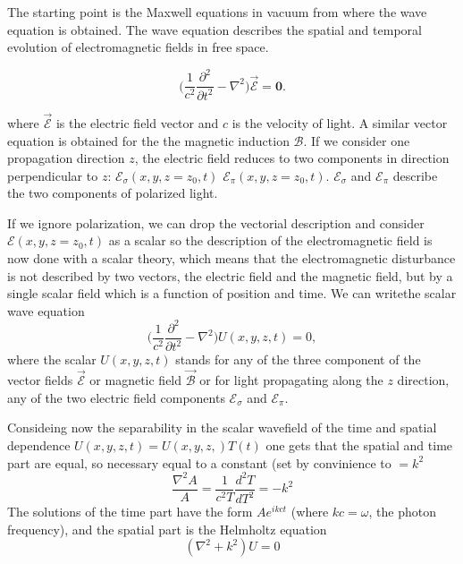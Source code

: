 \documentclass{iucr}              %
\begin{document}
The starting point is the Maxwell equations in vacuum from where the wave equation is obtained. The wave equation describes the spatial and temporal evolution of electromagnetic fields in free space. 

\begin{equation}\label{eq: d'Alembert electric field}
	\Big( \frac{1}{c^2} \frac{\partial^2}{\partial t^2}-\nabla^2\Big) \vec{\mathcal{E}} = \bm{0}.
\end{equation}


where $\vec{\mathcal{E}}$ is the electric field vector and $c$ is the velocity of light. A similar vector equation is obtained for the the magnetic induction $\mathcal{B}$. If we consider one propagation direction $z$, the electric field reduces to two components in direction perpendicular to $z$: $\mathcal{E}_\sigma(x,y,z=z_0,t)$ $\mathcal{E}_\pi(x,y,z=z_0,t)$. $\mathcal{E}_\sigma$ and $\mathcal{E}_\pi$ describe the two components of polarized light. 

If we ignore polarization, we can drop the vectorial description and consider $\mathcal{E}(x,y,z=z_0,t)$ as a scalar so the description of the electromagnetic field is now done with a scalar theory, which means that the electromagnetic disturbance is not described by two vectors, the electric field and the magnetic field, but by a single scalar field which is a function of position and time. We can writethe scalar wave equation
\begin{equation}\label{eq: d'Alembert scalar field}
\Big(\frac{1}{c^2} \frac{\partial^2}{\partial t^2}-\nabla^2\Big) U(x,y,z,t) = 0,
\end{equation}
where the scalar $U(x,y,z,t)$ stands for any of the three component of the vector fields $\vec{\mathcal{E}}$ or magnetic field $\vec{\mathcal{B}}$ or for light propagating along the $z$ direction, any of the two electric field components $\mathcal{E}_\sigma$ and $\mathcal{E}_\pi$. 

Consideing now the separability in the scalar wavefield of the time and spatial dependence $U(x,y,z,t)=U(x,y,z,)T(t)$ one gets that the spatial and time part are equal, so necessary equal to a constant (set by convinience to $=k^2$
\begin{equation}
\frac{\nabla^2 A}{A}=\frac{1}{c^2 T} \frac{d^2 T}{dT^2} = -k^2
\end{equation}
The solutions of the time part have the form $ A e^{i k c t}$ (where $k c = \omega$, the photon frequency), and the spatial part is the Helmholtz equation
\begin{equation}\label{eq: Helmholtz equation}
(\nabla^2 + k^2) U = 0
\end{equation}
\end{document}
